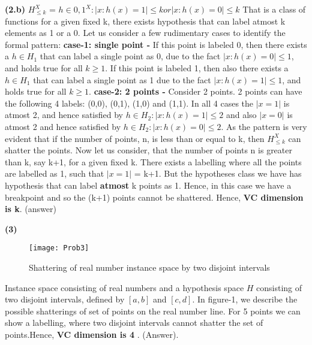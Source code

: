 \documentclass{article}
\renewcommand\part[1]{\vspace{.10in}\textbf{(#1)}}
\begin{document}
    \part{2.b}
    $H_{\leq k}^X$ = ${ h \in {0,1}^X : |{x:h(x)=1}| \leq k or |{x:h(x)=0}| \leq k}$ \newline
    That is a class of functions for a given fixed k, there exists hypothesis that can label atmost k elements as 1 or a 0. Let us consider a few rudimentary cases to identify the formal pattern: \newline
    \textbf {case-1: single point - }  If this point is labeled 0, then there exists a $h \in H_{1}$ that can label a single point as 0, due to the fact $|{x:h(x)=0}| \leq 1$, and holds true for all $k \geq 1$. \newline
    If this point is labeled 1, then also there exists a $h \in H_{1}$ that can label a single point as 1 due to the fact $|{x:h(x)=1}| \leq 1$, and holds true for all $k \geq 1$. \newline
    \textbf {case-2: 2 points - } Consider 2 points. 2 points can have the following 4 labels: (0,0), (0,1), (1,0) and (1,1). In all 4 cases the $|x=1|$ is atmost 2, and hence satisfied by $h \in H_{2}:|x:h(x)=1| \leq 2$ and also $|x=0|$ is atmost 2 and hence satisfied by $h \in H_{2}:|x:h(x)=0| \leq 2$. \newline
    As the pattern is very evident that if the number of points, n, is less than or equal to k, then $H_{\leq k}^X$ can shatter the points.  \newline
    Now let us consider, that the number of points n is greater than k, say k+1, for a given fixed k. There exists a labelling where all the points are labelled as 1, such that $|x=1|$ = k+1. But the hypotheses class we have has hypothesis that can label \textbf {atmost} k points as 1. Hence, in this case we have a breakpoint and so the (k+1)  points cannot be shattered. \newline
    Hence, \textbf {VC dimension is k}. (answer) \newline

  \part{3}
  \begin{figure}[H]
   \centering
  \texttt{[image: Prob3]}
  \caption{Shattering of real number instance  space by two disjoint intervals}
  \end{figure}
  Instance space consisting of real numbers and a hypothesis space $H$ consisting of two disjoint intervals, defined by $[a,b]$ and $[c,d]$. \newline
  In figure-1, we describe the possible shatterings of set of points on the real number line. For 5 points we can show a labelling, where two disjoint intervals cannot shatter the set of points.Hence, \textbf {VC dimension is 4} . (Answer). \newline
\end{document}
